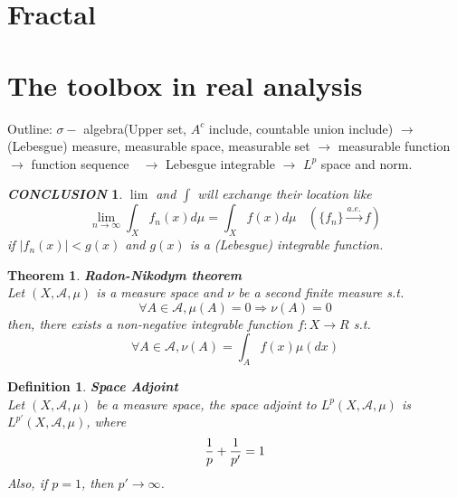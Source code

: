 \documentclass[12pt]{article}
\theoremstyle{plain}
\newtheorem{theorem}{\textbf{Theorem}}[section]
\newtheorem{definition}{\textbf{Definition}}[section]
\newtheorem{conclusion}{\textit{\textbf{CONCLUSION}}}[section]
\begin{document}
\newpage
\section{Fractal}










\newpage
\appendix
\section{The toolbox in real analysis}

Outline: $\sigma -$ algebra(Upper set, $A^c$ include, countable union include) $\rightarrow$ (Lebesgue) measure, measurable space, measurable set $\rightarrow$ measurable function $\rightarrow$ function sequence　$\rightarrow $ Lebesgue integrable $\rightarrow$ $L^p$ space and norm.


\begin{conclusion} $\lim$ and $\int$ will exchange their location like 
$$
\lim_{n\rightarrow \infty}\int_{X}f_n(x) d\mu = \int_{X}f(x)d\mu\ \ \ \ (\{f_n\} \xrightarrow {a.e.} f)
$$
if $|f_n(x)| < g(x)$ and $g(x)$ is a (Lebesgue) integrable function.
\end{conclusion}

\begin{theorem}\textbf{Radon-Nikodym theorem} 
\\\noindent Let $(X, \mathcal A, \mu)$ is a measure space and $\nu$ be a second finite measure s.t. 
$$
\forall A \in \mathcal A, \mu(A) = 0 \Rightarrow \nu(A) = 0
$$
then, there exists a non-negative integrable function $f:X \rightarrow R$ s.t.
$$
\forall A \in \mathcal A, \nu(A) = \int_{A}f(x) \mu(dx)
$$
\end{theorem}



\begin{definition}\textbf{Space Adjoint}
\\\noindent Let $(X, \mathcal A, \mu)$ be a measure space, the space adjoint to $L^p(X, \mathcal A, \mu)$ is $L^{p'}(X, \mathcal A, \mu)$, where 
$$
{1\over p } + {1\over p' }  = 1
$$
         Also, if $p = 1$, then $p' \rightarrow \infty$.
\end{definition}
\end{document}
